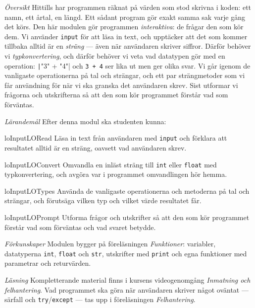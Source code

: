 \emph{Översikt}
Hittills har programmen räknat på värden som stod skrivna i koden: ett
namn, ett årtal, en längd.  Ett sådant program gör exakt samma sak varje
gång det körs.  Den här modulen gör programmen \emph{interaktiva}: de
frågar den som kör dem.  Vi använder \texttt{input} för att
läsa in text, och upptäcker att det som kommer tillbaka alltid är en
\emph{sträng} --- även när användaren skriver siffror.  Därför behöver vi
\emph{typkonvertering}, och därför behöver vi veta vad datatypen gör med
en operation: \texttt|"3" + "4"| och
\texttt{3 + 4} ser lika ut men ger olika svar.  Vi går
igenom de vanligaste operationerna på tal och strängar, och ett par
strängmetoder som vi får användning för när vi ska granska det användaren
skrev.  Sist utformar vi frågorna och utskrifterna så att den som kör
programmet förstår vad som förväntas.

\emph{Lärandemål}
Efter denna modul ska studenten kunna:
\begin{restatable}{lo}{InputLORead}\label{InputLORead}%
  Läsa in text från användaren med \texttt{input} och
  förklara att resultatet alltid är en sträng, oavsett vad användaren
  skrev.
\end{restatable}%
\begin{restatable}{lo}{InputLOConvert}\label{InputLOConvert}%
  Omvandla en inläst sträng till \texttt{int} eller
  \texttt{float} med typkonvertering, och avgöra var i
  programmet omvandlingen hör hemma.
\end{restatable}%
\begin{restatable}{lo}{InputLOTypes}\label{InputLOTypes}%
  Använda de vanligaste operationerna och metoderna på tal och strängar,
  och förutsäga vilken typ och vilket värde resultatet får.
\end{restatable}%
\begin{restatable}{lo}{InputLOPrompt}\label{InputLOPrompt}%
  Utforma frågor och utskrifter så att den som kör programmet förstår
  vad som förväntas och vad svaret betydde.
\end{restatable}%

\emph{Förkunskaper}
Modulen bygger på föreläsningen \emph{Funktioner}:
variabler, datatyperna \texttt{int}, \texttt{float}
och \texttt{str}, utskrifter med \texttt{print}
och egna funktioner med parametrar och returvärden.

\emph{Läsning}
Kompletterande material finns i kursens videogenomgång \emph{Inmatning
och felhantering}.  Vad programmet ska göra när användaren skriver något
oväntat --- särfall och \texttt{try}/\texttt{except}
--- tas upp i föreläsningen \emph{Felhantering}.
